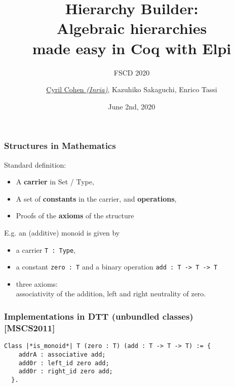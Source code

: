 \documentclass[11pt]{beamer}
\let\L=\lstinline
\begin{document}
\title[Hierarchy Builder]{{Hierarchy Builder:}\\ {Algebraic
    hierarchies} \\ {made easy} {in {\sc Coq} with {\sc Elpi}}}
\subtitle{FSCD 2020}

\author[\underline{Cohen}, Sakaguchi, Tassi]{
  \underline{Cyril Cohen \textit{(Inria)}}, Kazuhiko Sakaguchi, Enrico
Tassi}


\date{June 2nd, 2020}

\begin{frame}
\titlepage
\end{frame}

\begin{frame}[fragile]
  \frametitle{Structures in Mathematics}

  Standard definition:
  \begin{itemize}
  \item A \textbf{carrier} in Set / Type,
  \item A set of \textbf{constants} in the carrier, and \textbf{operations},
  \item Proofs of the \textbf{axioms} of the structure
  \end{itemize}

  \pause
  \vfill

  E.g. an (additive) monoid is given by
  \begin{itemize}
  \item a carrier \L{T : Type},
  \item a constant \L{zero : T} and a binary operation %
    \L{add : T -> T -> T}
  \item three axioms: \\
    associativity of the addition, left and right neutrality of zero.
  \end{itemize}

\end{frame}


\begin{frame}[fragile]
  \frametitle{Implementations in DTT (unbundled classes) \\ \hfill [MSCS2011]}

\begin{lstlisting}
Class |*is_monoid*| T (zero : T) (add : T -> T -> T) := {
    addrA : associative add;
    add0r : left_id zero add;
    add0r : right_id zero add;
  }.
\end{lstlisting}

\end{frame}
\end{document}
